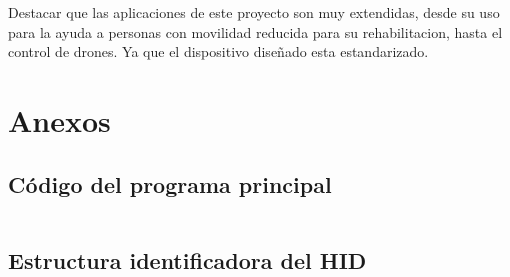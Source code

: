 \documentclass[a4paper,twoside]{article}
\begin{document}
Destacar que las aplicaciones de este proyecto son muy extendidas, desde su uso para la ayuda a personas con movilidad reducida para su rehabilitacion, hasta el control de drones. Ya que el dispositivo diseñado esta estandarizado.

\newpage
\section{Anexos}
\subsection{Código del programa principal}
\begin{mdframed}[linecolor=black, topline=false, bottomline=false, leftline=false, rightline=false]
\inputminted[linenos,breaklines,frame=lines,framesep=2mm]{c}{codes/main.c}
\end{mdframed}

\subsection{Estructura identificadora del HID}
\begin{mdframed}[linecolor=black, topline=false, bottomline=false, leftline=false, rightline=false]
\inputminted[linenos,breaklines,frame=lines,framesep=2mm]{c}{codes/usb_mouse_structs.c}
\end{mdframed}
\end{document}
